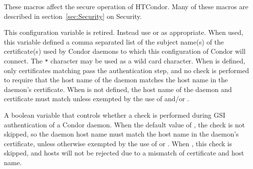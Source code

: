 These macros affect the secure operation of HTCondor.
Many of these macros are described in
section~\ref{sec:Security} on Security.

\begin{description}
\label{param:SecAuthentication}
\item[\Macro{SEC\_*\_AUTHENTICATION}]
\Todo

\label{param:SecEncryption}
\item[\Macro{SEC\_*\_ENCRYPTION}]
\Todo

\label{param:SecIntegrity}
\item[\Macro{SEC\_*\_INTEGRITY}]
\Todo

\label{param:SecNegotiation}
\item[\Macro{SEC\_*\_NEGOTIATION}]
\Todo

\label{param:SecAuthenticationMethods}
\item[\Macro{SEC\_*\_AUTHENTICATION\_METHODS}]
\Todo

\label{param:SecCryptoMethods}
\item[\Macro{SEC\_*\_CRYPTO\_METHODS}]
\Todo

\label{param:GSIDaemonName}
\item[\Macro{GSI\_DAEMON\_NAME}]
  This configuration variable is retired.
  Instead use  or  as
  appropriate. When used, this variable defined
  a comma separated list of the subject
  name(s) of the certificate(s) used by Condor daemons to
  which this configuration of Condor will connect.
  The \verb|*| character may be used as a wild card character.
  When  is defined, 
  only certificates matching
   pass the authentication step, and no
  check is performed to require that the host name of the daemon
  matches the host name in the daemon's certificate.  
  When  is not defined, 
  the host name of the daemon and certificate must match unless
  exempted by the use of  and/or
  .

\label{param:GSISkipHostCheck}
\item[\Macro{GSI\_SKIP\_HOST\_CHECK}]
  A boolean variable that controls whether a check is performed during
  GSI authentication of a Condor daemon.  
  When the default value of ,
  the check is not skipped, so the daemon host name must match the
  host name in the daemon's certificate, 
  unless otherwise exempted by the use of  or
  .
  When , this check is skipped, and hosts will not be rejected
  due to a mismatch of certificate and host name.


\end{description}
